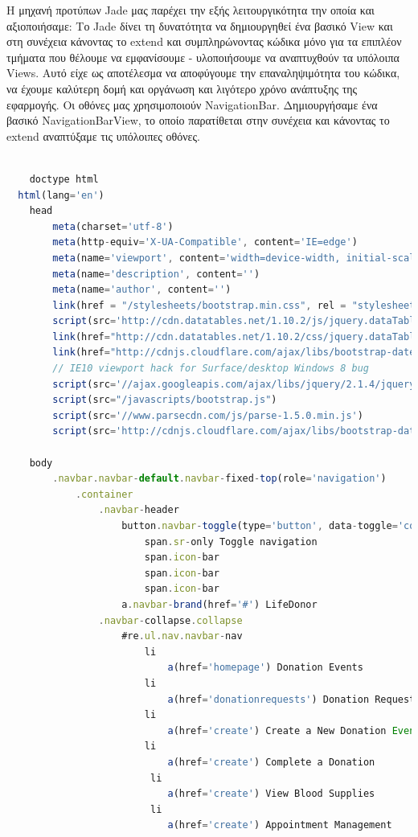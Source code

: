 	Η μηχανή προτύπων Jade μας παρέχει την εξής λειτουργικότητα την οποία και αξιοποιήσαμε: Το Jade δίνει τη δυνατότητα να δημιουργηθεί ένα βασικό View και στη συνέχεια κάνοντας το extend και συμπληρώνοντας κώδικα μόνο για τα  επιπλέον τμήματα που θέλουμε να εμφανίσουμε - υλοποιήσουμε να αναπτυχθούν τα υπόλοιπα Views. Αυτό είχε ως αποτέλεσμα να αποφύγουμε την επαναληψιμότητα του κώδικα, να έχουμε καλύτερη δομή και οργάνωση και λιγότερο χρόνο ανάπτυξης της εφαρμογής. Οι οθόνες μας χρησιμοποιούν NavigationBar. Δημιουργήσαμε ένα βασικό NavigationBarView, το οποίο παρατίθεται στην συνέχεια και κάνοντας το extend αναπτύξαμε τις υπόλοιπες οθόνες.
	
	\begin{lstlisting}[language=Javascript]			
	
	doctype html
  html(lang='en')
    head
        meta(charset='utf-8')
        meta(http-equiv='X-UA-Compatible', content='IE=edge')
        meta(name='viewport', content='width=device-width, initial-scale=1')
        meta(name='description', content='')
        meta(name='author', content='')
        link(href = "/stylesheets/bootstrap.min.css", rel = "stylesheet")
        script(src='http://cdn.datatables.net/1.10.2/js/jquery.dataTables.min.js')
        link(href="http://cdn.datatables.net/1.10.2/css/jquery.dataTables.min.css",rel="stylesheet")
        link(href="http://cdnjs.cloudflare.com/ajax/libs/bootstrap-datepicker/1.3.0/css/datepicker.css",rel="stylesheet",type="text/css")
        // IE10 viewport hack for Surface/desktop Windows 8 bug
        script(src='//ajax.googleapis.com/ajax/libs/jquery/2.1.4/jquery.min.js')
        script(src="/javascripts/bootstrap.js")
        script(src='//www.parsecdn.com/js/parse-1.5.0.min.js')
        script(src='http://cdnjs.cloudflare.com/ajax/libs/bootstrap-datepicker/1.3.0/js/bootstrap-datepicker.js')

    body
        .navbar.navbar-default.navbar-fixed-top(role='navigation')
            .container
                .navbar-header
                    button.navbar-toggle(type='button', data-toggle='collapse', data-target='.navbar-collapse')
                        span.sr-only Toggle navigation
                        span.icon-bar
                        span.icon-bar
                        span.icon-bar
                    a.navbar-brand(href='#') LifeDonor
                .navbar-collapse.collapse
                    #re.ul.nav.navbar-nav
                        li
                            a(href='homepage') Donation Events
                        li
                            a(href='donationrequests') Donation Requests
                        li
                            a(href='create') Create a New Donation Event
                        li
                            a(href='create') Complete a Donation
                         li
                            a(href='create') View Blood Supplies
                         li
                            a(href='create') Appointment Management
                            

\end{lstlisting}

